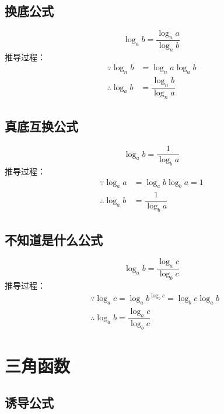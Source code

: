\documentclass[a4paper, 12pt, draft]{article}
\begin{document}
    \newpage
    \subsection{换底公式}
    \begin{equation}\label{eq1.3}
        \log_{a}{b} = \dfrac{ \log_{n}{a} }{ \log_{n}{b} }
    \end{equation}
    推导过程：
    $$
    \begin{aligned}
        \because    \log_{n}{b} &= \log_{n}{a} \log_{a}{b} \\
        \therefore  \log_{a}{b} &= \dfrac{ \log_{n}{b} }{ \log_{n}{a} }
    \end{aligned}
    $$


    \subsection{真底互换公式}
    \begin{equation}\label{eq1.4}
        \log_{a}{b} = \dfrac{1}{ \log_{b}{a} }
    \end{equation}
    推导过程：
    $$
    \begin{aligned}
        \because    \log_{a}{a} &= \log_{a}{b} \log_{b}{a} = 1 \\
        \therefore  \log_{a}{b} &= \dfrac{1}{ \log_{b}{a} }
    \end{aligned}
    $$


    \subsection[未知公式]{不知道是什么公式}
    \begin{equation}\label{1.5}
        \log_{a}{b} = \dfrac{ \log_{a}{c} }{ \log_{b}{c} }
    \end{equation}
    推导过程：
    $$
    \begin{aligned}
        & \because \log_{a}{c} = \log_{a}{b^{ \log_{b}{c} }} = \log_{b}{c} \log_{a}{b} \\
        & \therefore \log_{a}{b} = \dfrac{ \log_{a}{c} }{ \log_{b}{c} }
    \end{aligned}
    $$

    \newpage
    \section{三角函数}
    \subsection{诱导公式}
\end{document}
